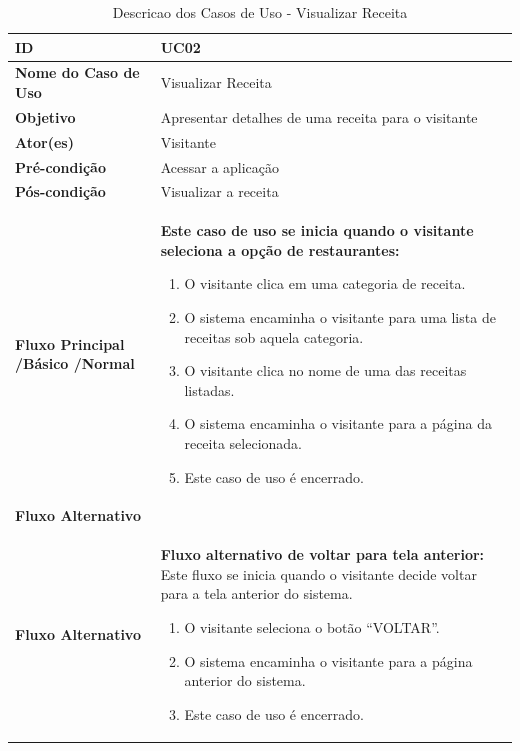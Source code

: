 \begin{table}[t]
\begin{tabular}{| p{6cm} | p{10cm} |}
	\hline
	\textbf{ID} & UC02\tabularnewline
	\hline
	\hline
	\textbf{Nome do Caso de Uso} & Visualizar Receita\tabularnewline
	\hline
	\textbf{Objetivo} & Apresentar detalhes de uma receita para o visitante\tabularnewline
	\hline
	\textbf{Ator(es)} & Visitante\tabularnewline
	\hline
	\textbf{Pré-condição} & Acessar a aplicação\tabularnewline
	\hline
	\textbf{Pós-condição} & Visualizar a receita\tabularnewline
	\hline
	\textbf{Fluxo Principal /Básico /Normal} & \textbf{Este caso de uso se inicia quando o visitante seleciona a opção de restaurantes:}
	\vspace{0.2cm}
	\begin{enumerate}
		\item O visitante clica em uma categoria de receita.
		\item O sistema encaminha o visitante para uma lista de receitas sob aquela categoria.
		\item O visitante clica no nome de uma das receitas listadas.
		\item O sistema encaminha o visitante para a página da receita selecionada.
		\item Este caso de uso é encerrado.
	\end{enumerate} \tabularnewline
	\hline
	\textbf{Fluxo Alternativo} & \tabularnewline
	\hline
	\textbf{Fluxo Alternativo} & \textbf{Fluxo alternativo de voltar para tela anterior:}
	\vspace{0.2cm}
	Este fluxo se inicia quando o visitante decide voltar para a tela anterior do sistema.
	\begin{enumerate}
		\item O visitante seleciona o botão “VOLTAR”.
		\item O sistema encaminha o visitante para a página anterior do sistema.
		\item Este caso de uso é encerrado.
	\end{enumerate} \tabularnewline
	\hline
\end{tabular}
\caption{Descricao dos Casos de Uso - Visualizar Receita}
\label{DCU_Visualizar_Receita}
\end{table}

